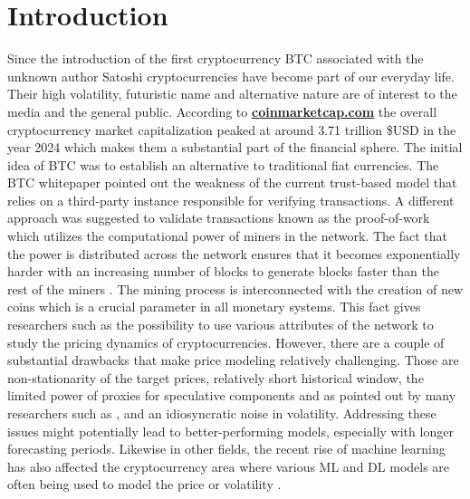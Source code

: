 \chapter{Introduction}
\label{chap:one}

Since the introduction of the first cryptocurrency \ac{BTC}
associated with the unknown author Satoshi \cite{Nakamoto2008} cryptocurrencies
have become part of our everyday life. Their high volatility, futuristic name 
and alternative nature are of interest to the media and the general public.
According to \textbf{\href{https://coinmarketcap.com/charts/}{coinmarketcap.com}}
the overall cryptocurrency 
market capitalization peaked at around 3.71 trillion \$USD in the year 2024
which makes them a substantial part of the financial sphere.
The initial idea of \ac{BTC} was to establish an alternative to traditional fiat currencies. 
The \ac{BTC} whitepaper
pointed out the weakness of the current trust-based model that relies on a third-party instance responsible
for verifying transactions.
A different approach was suggested to validate transactions known as the proof-of-work which
utilizes the computational power of miners in the network. The fact that the power is 
distributed across the network ensures that it becomes exponentially harder with an increasing number of blocks
to generate blocks faster than the rest of the miners \citep[pg.~6]{Nakamoto2008}. 
The mining process is interconnected with the creation of new coins which is a crucial parameter
in all monetary systems. This fact gives researchers such as \cite{Kukacka2023} 
the possibility to use various attributes of the network to study the pricing dynamics of cryptocurrencies. 
However, there are a couple of substantial drawbacks that make price modeling relatively challenging.
Those are non-stationarity of the target prices, relatively short historical window, the limited power of
proxies for speculative components and as pointed out by many researchers 
such as \citet{Bouri2022}, \citet{Dimpfl2021} and \citet{Watorek2023} an idiosyncratic noise in volatility.
Addressing these issues might potentially lead to better-performing models, especially
with longer forecasting periods. Likewise in other fields, the recent rise of machine learning 
has also affected the cryptocurrency area where various \ac{ML} and \ac{DL} models 
are often being used 
to model the price \cite{Khedr2021} or volatility \cite{Kristjanpoller2018}. 


